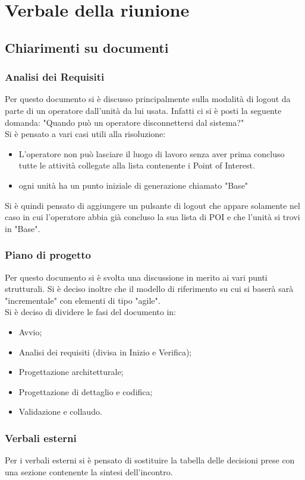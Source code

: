 \section{Verbale della riunione}
\subsection{Chiarimenti su documenti}
\subsubsection{Analisi dei Requisiti}
Per questo documento si è discusso principalmente sulla modalità di logout da parte di un operatore dall'unità da lui usata. Infatti ci si è posti la seguente domanda: "Quando può un operatore disconnettersi dal sistema?"\\
Si è pensato a vari casi utili alla risoluzione:
\begin{itemize}
	\item L'operatore non può lasciare il luogo di lavoro senza aver prima concluso tutte le attività collegate alla lista contenente i Point of Interest.
	\item ogni unità ha un punto iniziale di generazione chiamato "Base"
\end{itemize}
Si è quindi pensato di aggiungere un pulsante di logout che appare solamente nel caso in cui l'operatore abbia già concluso la sua lista di POI e che l'unità si trovi in "Base".

\subsubsection{Piano di progetto}
Per questo documento si è svolta una discussione in merito ai vari punti strutturali. Si è deciso inoltre che il modello di riferimento su cui si baserà sarà "incrementale" con elementi di tipo "agile".\\
Si è deciso di dividere le fasi del documento in:
\begin{itemize}
	\item Avvio;
	\item Analisi dei requisiti (divisa in Inizio e Verifica);
	\item Progettazione architetturale;
	\item Progettazione di dettaglio e codifica;
	\item Validazione e collaudo.
\end{itemize}

\subsubsection{Verbali esterni}
Per i verbali esterni si è pensato di sostituire la tabella delle decisioni prese con una sezione contenente la sintesi dell'incontro.


